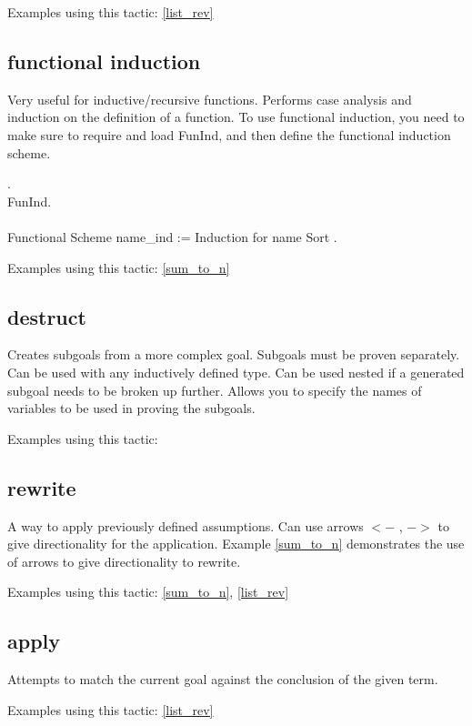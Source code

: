 \noindent
Examples using this tactic: 
\ref{list_rev}


\subsection{functional induction} \label{functional induction}
Very useful for inductive/recursive functions.
Performs case analysis and induction on the definition of a function.
To use functional induction, you need to make sure to require and load FunInd, and then define the functional induction scheme.

\begin{code}
 .	\\
\Load FunInd.
\\ \\
Functional Scheme name\_ind := 
  Induction for name Sort .
\end{code}

\noindent
Examples using this tactic: 
\ref{sum_to_n}


\subsection{destruct} \label{destruct}
Creates subgoals from a more complex goal. 
Subgoals must be proven separately.
Can be used with any inductively defined type.
Can be used nested if a generated subgoal needs to be broken up further.
Allows you to specify the names of variables to be used in proving the subgoals.

\noindent
Examples using this tactic: 



\subsection{rewrite} \label{rewrite}
A way to apply previously defined assumptions.
Can use arrows $<-$ , $->$ to give directionality for the application.
Example \ref{sum_to_n} demonstrates the use of arrows to give directionality to rewrite.

\noindent
Examples using this tactic: 
\ref{sum_to_n}, \ref{list_rev}


\subsection{apply} \label{apply}
Attempts to match the current goal against the conclusion of the given term.

\noindent
Examples using this tactic:
\ref{list_rev}






